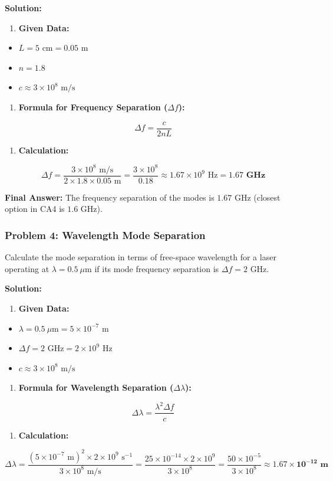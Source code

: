 \textbf{Solution:}
\begin{enumerate}
  \item \textbf{Given Data:}
\end{enumerate}
\begin{itemize}
  \item   $L = 5\text{ cm} = 0.05\text{ m}$
  \item   $n = 1.8$
  \item   $c \approx 3 \times 10^8\text{ m/s}$
\end{itemize}
\begin{enumerate}
  \item \textbf{Formula for Frequency Separation ($\Delta f$):}
\end{enumerate}
    \[ \Delta f = \frac{c}{2nL} \]
\begin{enumerate}
  \item \textbf{Calculation:}
\end{enumerate}
    \[ \Delta f = \frac{3 \times 10^8\text{ m/s}}{2 \times 1.8 \times 0.05\text{ m}} = \frac{3 \times 10^8}{0.18} \approx 1.67 \times 10^9\text{ Hz} = \mathbf{1.67\text{ GHz}} \]

\textbf{Final Answer:} The frequency separation of the modes is \textbf{$1.67\text{ GHz}$} (closest option in CA4 is \textbf{$1.6\text{ GHz}$}).


\subsubsection{Problem 4: Wavelength Mode Separation}
Calculate the mode separation in terms of free-space wavelength for a laser operating at $\lambda = 0.5\ \mu\text{m}$ if its mode frequency separation is $\Delta f = 2\text{ GHz}$.

\textbf{Solution:}
\begin{enumerate}
  \item \textbf{Given Data:}
\end{enumerate}
\begin{itemize}
  \item   $\lambda = 0.5\ \mu\text{m} = 5 \times 10^{-7}\text{ m}$
  \item   $\Delta f = 2\text{ GHz} = 2 \times 10^9\text{ Hz}$
  \item   $c \approx 3 \times 10^8\text{ m/s}$
\end{itemize}
\begin{enumerate}
  \item \textbf{Formula for Wavelength Separation ($\Delta \lambda$):}
\end{enumerate}
    \[ \Delta \lambda = \frac{\lambda^2 \Delta f}{c} \]
\begin{enumerate}
  \item \textbf{Calculation:}
\end{enumerate}
    \[ \Delta \lambda = \frac{(5 \times 10^{-7}\text{ m})^2 \times 2 \times 10^9\text{ s}^{-1}}{3 \times 10^8\text{ m/s}} = \frac{25 \times 10^{-14} \times 2 \times 10^9}{3 \times 10^8} = \frac{50 \times 10^{-5}}{3 \times 10^8} \approx \mathbf{1.67 \times 10^{-12}\text{ m}} \]

